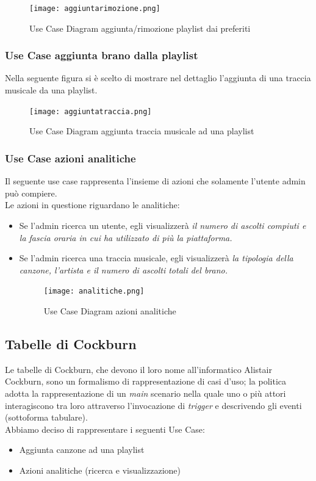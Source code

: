 \documentclass{article}
\begin{document}
			\begin{figure}[H]
				\centering
				\texttt{[image: aggiuntarimozione.png]}
				\caption{Use Case Diagram aggiunta/rimozione playlist dai preferiti}
			\end{figure}
			\newpage
			\subsubsection{Use Case aggiunta brano dalla playlist}
			Nella seguente figura si è scelto di mostrare nel dettaglio l'aggiunta di una traccia musicale da una playlist.
			
			\begin{figure}[H]
				\centering
				\texttt{[image: aggiuntatraccia.png]}
				\caption{Use Case Diagram aggiunta traccia musicale ad una playlist}
			\end{figure}
			
			\subsubsection{Use Case azioni analitiche}
			Il seguente use case rappresenta l'insieme di azioni che solamente l'utente admin può compiere.\\
			Le azioni in questione riguardano le analitiche:
			\begin{itemize}
				\item Se l'admin ricerca un utente, egli visualizzerà \textit{il numero di ascolti compiuti e la fascia oraria in cui ha utilizzato di più la piattaforma.}
				\item Se l'admin ricerca una traccia musicale, egli visualizzerà \textit{la tipologia della canzone, l'artista e il numero di ascolti totali del brano.}
				
				\begin{figure}[H]
					\centering
					\texttt{[image: analitiche.png]}
					\caption{Use Case Diagram azioni analitiche}
				\end{figure}
			\end{itemize}
			\newpage
		\subsection{Tabelle di Cockburn}
		Le tabelle di Cockburn, che devono il loro nome all'informatico Alistair Cockburn, sono un formalismo di rappresentazione di casi d'uso; la politica adotta la rappresentazione di un \textit{main} scenario nella quale uno o più attori interagiscono tra loro attraverso l'invocazione di \textit{trigger} e descrivendo gli eventi (sottoforma tabulare).\\
		Abbiamo deciso di rappresentare i seguenti Use Case:
		\begin{itemize}
			\item Aggiunta canzone ad una playlist 
			\item Azioni analitiche (ricerca e visualizzazione)
		\end{itemize}
		\newpage
		
		\newpage
		
		\newpage
		
\end{document}
